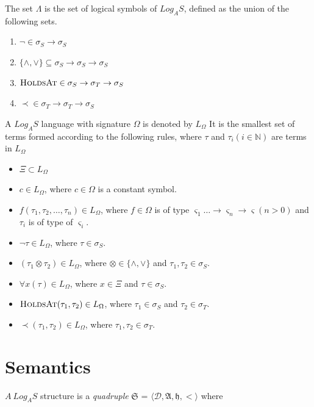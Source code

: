 The set $\Lambda$ is the set of logical symbols of $Log_A S$, defined
as the union of the following sets.

\begin{enumerate}
  \item $\neg \in \sigma_S \to \sigma_S$
  \item $\{\land, \lor \} \subseteq \sigma_S \to \sigma_S \to \sigma_S$
  \item $\textsc{HoldsAt} \in \sigma_S \to \sigma_T \to \sigma_S$
  \item $\prec \in \sigma_T \to \sigma_T \to \sigma_S$
\end{enumerate}

A $Log_AS$ language with signature $\Omega$ is denoted by $L_{\Omega}$ It
is the smallest set of terms formed according to the following
rules, where $\tau$ and $\tau_i (i \in \mathbb{N})$ are terms in $L_{\Omega}$

\begin{itemize}
  \item $\Xi \subset L_{\Omega}$
  \item $c \in L_{\Omega}$, where $c \in \Omega$ is a constant symbol.
  \item $f(\tau_1, \tau_2, \dots, \tau_n) \in L_{\Omega}$, where $f \in \Omega$ is of type
        $\varsigma_1 \dots \to \varsigma_n \to \varsigma  (n > 0)$ and $\tau_i$ is of type of $\varsigma_i$.
  \item $\neg \tau \in L_{\Omega}$, where $\tau \in \sigma_S$.
  \item $(\tau_1 \otimes \tau_2) \in L_{\Omega}$, where $\otimes \in \{\land, \lor\}$ and $\tau_1, \tau_2 \in \sigma_S$.
  \item $\forall x(\tau) \in L_{\Omega}$, where $x \in \Xi$ and $\tau \in \sigma_S$.
  \item $\textsc{HoldsAt}(\tau_1, \tau_2) \in L_{\Omega}$, where $\tau_1 \in \sigma_S$ and $\tau_2 \in \sigma_T$.
  \item $\prec(\tau_1, \tau_2) \in L_{\Omega}$, where $\tau_1, \tau_2 \in \sigma_T$.
\end{itemize}


\section{Semantics}

\begin{defn} $A  \ Log_AS$ structure is a \textit{quadruple} $\mathfrak{S}$
  = $\langle \mathcal{D}, \mathfrak{A}, \mathfrak{h}, < \rangle$ where
\end{defn}

